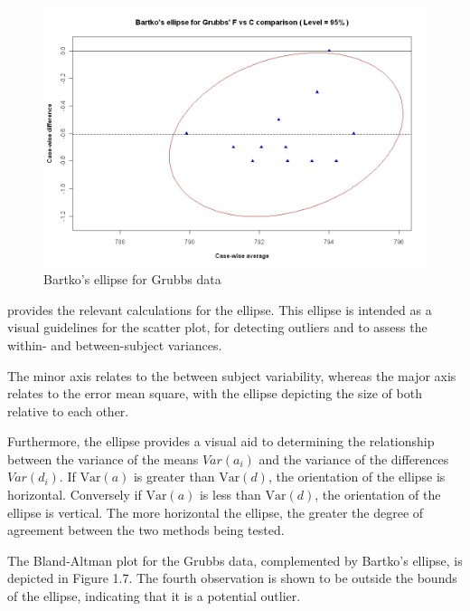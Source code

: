 \documentclass[12pt, a4paper]{report}
\theoremstyle{plain}
\theoremstyle{definition}
\theoremstyle{remark}
\begin{document}

\begin{figure}[h!]
	\includegraphics[width=130mm]{images/GrubbsBartko.jpeg}
	\caption{Bartko's ellipse for Grubbs data}\label{GrubbsBartko}
\end{figure}

\citet{AltmanEllipse} provides the relevant calculations for the ellipse. This ellipse is intended as a visual
guidelines for the scatter plot, for detecting outliers and to
assess the within- and between-subject variances.

The minor axis relates to the between subject variability, whereas
the major axis relates to the error mean square, with the ellipse
depicting the size of both relative to each other.



Furthermore, the ellipse provides a visual aid to determining the relationship between the variance of the means $Var(a_{i})$ and the variance of the differences $Var(d_{i})$. If $\mbox{Var}(a)$ is greater than $\mbox{Var}(d)$, the orientation of the ellipse is horizontal. Conversely if $\mbox{Var}(a)$ is less than $\mbox{Var}(d)$, the orientation of the ellipse is vertical. The more horizontal the ellipse, the greater the degree of agreement between the two methods being tested.



The Bland-Altman plot for the Grubbs data, complemented by Bartko's ellipse, is depicted in Figure 1.7.
The fourth observation is shown to be outside the bounds of the ellipse, indicating that it is a potential outlier.
\end{document}
